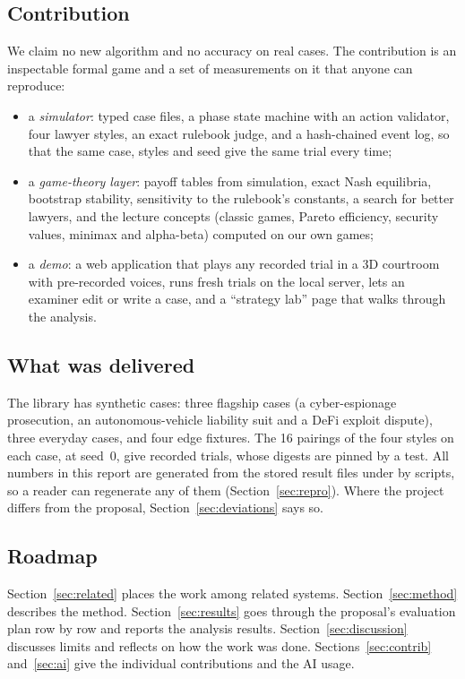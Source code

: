 \subsection{Contribution}
We claim no new algorithm and no accuracy on real cases. The contribution is an inspectable formal game and a set of measurements on it that anyone can reproduce:
\begin{itemize}
\item a \emph{simulator}: typed case files, a phase state machine with an action validator, four lawyer styles, an exact rulebook judge, and a hash-chained event log, so that the same case, styles and seed give the same trial every time;
\item a \emph{game-theory layer}: payoff tables from simulation, exact Nash equilibria, bootstrap stability, sensitivity to the rulebook's constants, a search for better lawyers, and the lecture concepts (classic games, Pareto efficiency, security values, minimax and alpha-beta) computed on our own games;
\item a \emph{demo}: a web application that plays any recorded trial in a 3D courtroom with pre-recorded voices, runs fresh trials on the local server, lets an examiner edit or write a case, and a ``strategy lab'' page that walks through the analysis.
\end{itemize}

\subsection{What was delivered}
The library has \NCases{} synthetic cases: three flagship cases (a cyber-espionage prosecution, an autonomous-vehicle liability suit and a DeFi exploit dispute), three everyday cases, and four edge fixtures. The 16 pairings of the four styles on each case, at seed~0, give \ReplayTotal{} recorded trials, whose digests are pinned by a test. All numbers in this report are generated from the stored result files under  by scripts, so a reader can regenerate any of them (Section~\ref{sec:repro}). Where the project differs from the proposal, Section~\ref{sec:deviations} says so.

\subsection{Roadmap}
Section~\ref{sec:related} places the work among related systems. Section~\ref{sec:method} describes the method. Section~\ref{sec:results} goes through the proposal's evaluation plan row by row and reports the analysis results. Section~\ref{sec:discussion} discusses limits and reflects on how the work was done. Sections~\ref{sec:contrib} and~\ref{sec:ai} give the individual contributions and the AI usage.
